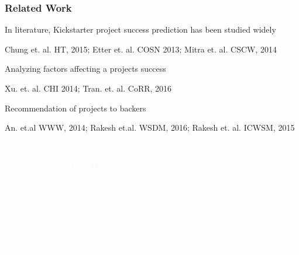\documentclass[9pt]{beamer}
\newcommand{\SubItemBlue}[1]{
	{\setlength\itemindent{15pt} \item[\color{blue}\textbullet] #1}
}
\newcommand{\SubItemWhite}[1]{
	{\setlength\itemindent{15pt} \item[\color{white}\textbullet] #1}
}
\begin{document}
\begin{frame}
	\frametitle{Related Work}
	\begin{itemize}[label=\textcolor{blue}{\textbullet}]
		\item{In literature, Kickstarter project success prediction has been studied widely}
		\SubItemBlue{\small Chung et. al. HT, 2015; Etter et. al. COSN 2013; Mitra et. al. CSCW, 2014}
		\item{ {Analyzing factors affecting a projects success}}
		\SubItemBlue{\small {Xu. et. al. CHI 2014; Tran. et. al. CoRR, 2016}}
		\item{ {Recommendation of projects to backers }}
		\SubItemBlue{\small {An. et.al WWW, 2014; Rakesh et.al. WSDM, 2016; Rakesh et. al. ICWSM, 2015}}
		\item[\textcolor{white}{\textbullet}]{\textcolor{white} {Rewards delivery delay}}
		\SubItemWhite{\small \textcolor{white} {T. Tran et. al. ASONAM 2017, Y. Kim et. al. CSCW, 2017}}
		
		\item[\textcolor{white}{\textbullet}]{\textcolor{white} {Previous studies are limited to understanding projects during funding phase}}
		\vspace{10pt}
		\item[\textcolor{white}{\textbullet}]{\textcolor{white} {No study about \textit{Production Phase}}}
		
	\end{itemize}
	
	\vspace{10pt}
	\centering
	\textcolor{white} {Our work analyzes quality of crowdfunded products in market.}
	
	\vspace{10pt}
	\centering
	\textcolor{white}{Why is it important ?}
	
\end{frame}
\end{document}
